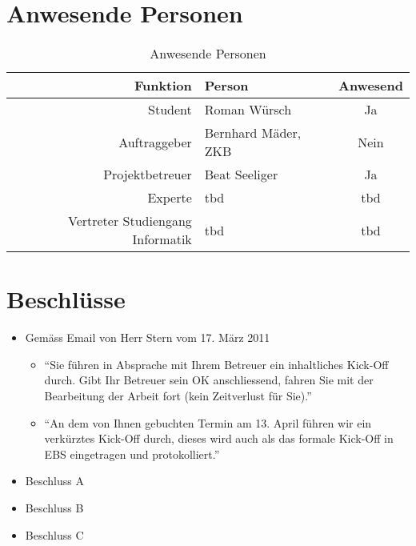  \section{Anwesende Personen}
    
  \begin{table}[ht]
    \begin{center}
      \begin{tabular}{rlc}
        \toprule
        Funktion & Person & Anwesend\\
        \midrule
        Student & Roman Würsch & Ja\\
        Auftraggeber & Bernhard Mäder, ZKB & Nein\\
        Projektbetreuer & Beat Seeliger & Ja\\
        Experte & tbd & tbd\\
        Vertreter Studiengang Informatik & tbd & tbd\\
        \bottomrule
      \end{tabular}
      \caption{Anwesende Personen}
      \label{tab:anwesendePersonen}
    \end{center}
  \end{table}

  \section{Beschlüsse}
  \begin{itemize}
      \item Gemäss Email von Herr Stern vom 17. März 2011
      \begin{itemize}
        \item ``Sie führen in Absprache mit Ihrem Betreuer ein inhaltliches
        Kick-Off durch. Gibt Ihr Betreuer sein OK anschliessend, fahren Sie
        mit der Bearbeitung der Arbeit fort (kein Zeitverlust für Sie).''
        \item ``An dem von Ihnen gebuchten Termin am 13. April führen wir
        ein verkürztes Kick-Off durch, dieses wird auch als das formale
        Kick-Off in EBS eingetragen und protokolliert.''
      \end{itemize} 
      \item Beschluss A
      \item Beschluss B
      \item Beschluss C
  \end{itemize}